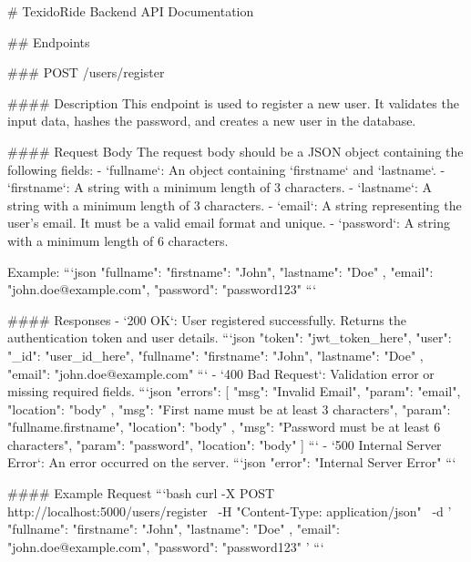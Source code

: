 # TexidoRide Backend API Documentation

## Endpoints

### POST /users/register

#### Description
This endpoint is used to register a new user. It validates the input data, hashes the password, and creates a new user in the database.

#### Request Body
The request body should be a JSON object containing the following fields:
- `fullname`: An object containing `firstname` and `lastname`.
  - `firstname`: A string with a minimum length of 3 characters.
  - `lastname`: A string with a minimum length of 3 characters.
- `email`: A string representing the user's email. It must be a valid email format and unique.
- `password`: A string with a minimum length of 6 characters.

Example:
```json
{
  "fullname": {
    "firstname": "John",
    "lastname": "Doe"
  },
  "email": "john.doe@example.com",
  "password": "password123"
}
```

#### Responses
- `200 OK`: User registered successfully. Returns the authentication token and user details.
  ```json
  {
    "token": "jwt_token_here",
    "user": {
      "_id": "user_id_here",
      "fullname": {
        "firstname": "John",
        "lastname": "Doe"
      },
      "email": "john.doe@example.com"
    }
  }
  ```
- `400 Bad Request`: Validation error or missing required fields.
  ```json
  {
    "errors": [
      {
        "msg": "Invalid Email",
        "param": "email",
        "location": "body"
      },
      {
        "msg": "First name must be at least 3 characters",
        "param": "fullname.firstname",
        "location": "body"
      },
      {
        "msg": "Password must be at least 6 characters",
        "param": "password",
        "location": "body"
      }
    ]
  }
  ```
- `500 Internal Server Error`: An error occurred on the server.
  ```json
  {
    "error": "Internal Server Error"
  }
  ```

#### Example Request
```bash
curl -X POST http://localhost:5000/users/register \
-H "Content-Type: application/json" \
-d '{
  "fullname": {
    "firstname": "John",
    "lastname": "Doe"
  },
  "email": "john.doe@example.com",
  "password": "password123"
}'
```